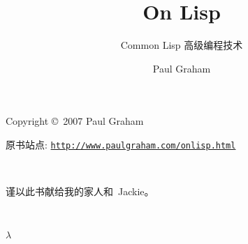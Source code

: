 

\title{On Lisp}
\subtitle{Common Lisp 高级编程技术}
\author{Paul Graham}

\maketitle

\vfill
Copyright \copyright\ 2007 Paul Graham

原书站点: \href{http://www.paulgraham.com/onlisp.html}%
{\texttt{http://www.paulgraham.com/onlisp.html}}


\clearpage

~
\vfill
\begin{center}
  谨以此书献给我的家人和~Jackie。
\end{center}
\vfill

\newpage

~
\vfill
\begin{center}
  $\lambda$
\end{center}
\vfill

